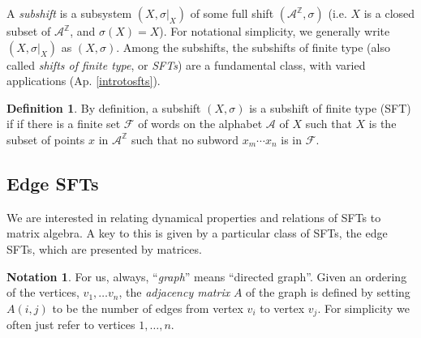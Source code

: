 \documentclass{amsart}
\theoremstyle{definition}
\newtheorem{de}[equation]{Definition}
\newtheorem{nota}[equation]{Notation}
\theoremstyle{definition}
\newcommand{\apr}{(Ap. \ref}
\newcommand{\Z}{\mathbb Z}
\numberwithin{equation}{subsection}
\begin{document}
     A {\it subshift} is a subsystem $(X,\sigma|_X)$ of some full shift
$(\mathcal A^{\Z}, \sigma)$
(i.e. $X$ is a closed subset of $\mathcal A^{\Z}$, and $\sigma (X)=X$).
For notational
     simplicity, we generally write $(X,\sigma|_X)$ as $(X,\sigma)$.
     Among the subshifts, the  subshifts of finite type
(also called {\it shifts of finite type},
     or {\it SFTs}) are a fundamental class, with varied
     applications \apr{introtosfts}).


\begin{de} \label{sftdefn} By definition, a subshift $(X, \sigma )$ is
  a subshift of finite type (SFT)
if if there is a finite set $\mathcal F$ of words on the alphabet $\mathcal A$
of $X$ such that $X$ is the subset of points $x$ in $\mathcal A^{\Z}$
such that no subword $x_m\cdots x_n$ is in $\mathcal F$.
\end{de}


     \subsection{Edge SFTs}\label{sec:edgesfts}

     We are interested in relating dynamical properties and relations
     of SFTs
     to matrix algebra. A key to this is given by a particular class
     of SFTs, the edge SFTs, which are presented by matrices.

     \begin{nota}  For us, always,
       ``{\it graph}'' means ``directed graph''.
Given an ordering of the vertices, $v_1, \dots v_n$, the
{\it adjacency matrix} $A$ of the graph is defined by setting
 $A(i,j)$ to be the number of
edges from vertex $v_i$ to vertex $v_j$. For simplicity we often
just refer to vertices $1, \dots , n$.
 \end{nota}
\end{document}
